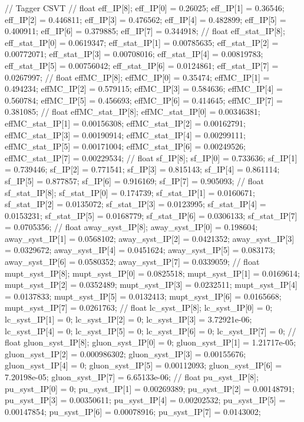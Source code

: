 // Tagger CSVT
// float eff_IP[8];
eff_IP[0] = 0.26025; eff_IP[1] = 0.36546; eff_IP[2] = 0.446811; 
eff_IP[3] = 0.476562; eff_IP[4] = 0.482899; eff_IP[5] = 0.400911; 
eff_IP[6] = 0.379885; eff_IP[7] = 0.344918; 
// float eff_stat_IP[8];
eff_stat_IP[0] = 0.0619347; eff_stat_IP[1] = 0.00785635; eff_stat_IP[2] = 0.00772071; 
eff_stat_IP[3] = 0.00708016; eff_stat_IP[4] = 0.00819783; eff_stat_IP[5] = 0.00756042; 
eff_stat_IP[6] = 0.0124861; eff_stat_IP[7] = 0.0267997; 
// float effMC_IP[8];
effMC_IP[0] = 0.35474; effMC_IP[1] = 0.494234; effMC_IP[2] = 0.579115; 
effMC_IP[3] = 0.584636; effMC_IP[4] = 0.560784; effMC_IP[5] = 0.456693; 
effMC_IP[6] = 0.414645; effMC_IP[7] = 0.381085; 
// float effMC_stat_IP[8];
effMC_stat_IP[0] = 0.00346381; effMC_stat_IP[1] = 0.00156308; effMC_stat_IP[2] = 0.00162791; 
effMC_stat_IP[3] = 0.00190914; effMC_stat_IP[4] = 0.00299111; effMC_stat_IP[5] = 0.00171004; 
effMC_stat_IP[6] = 0.00249526; effMC_stat_IP[7] = 0.00229534; 
// float sf_IP[8];
sf_IP[0] = 0.733636; sf_IP[1] = 0.739446; sf_IP[2] = 0.771541; 
sf_IP[3] = 0.815143; sf_IP[4] = 0.861114; sf_IP[5] = 0.877857; 
sf_IP[6] = 0.916169; sf_IP[7] = 0.905093; 
// float sf_stat_IP[8];
sf_stat_IP[0] = 0.174739; sf_stat_IP[1] = 0.0160671; sf_stat_IP[2] = 0.0135072; 
sf_stat_IP[3] = 0.0123995; sf_stat_IP[4] = 0.0153231; sf_stat_IP[5] = 0.0168779; 
sf_stat_IP[6] = 0.0306133; sf_stat_IP[7] = 0.0705356; 
// float away_syst_IP[8];
away_syst_IP[0] = 0.198604; away_syst_IP[1] = 0.0568102; away_syst_IP[2] = 0.0421352; 
away_syst_IP[3] = 0.0329672; away_syst_IP[4] = 0.0451624; away_syst_IP[5] = 0.083173; 
away_syst_IP[6] = 0.0580352; away_syst_IP[7] = 0.0339059; 
// float mupt_syst_IP[8];
mupt_syst_IP[0] = 0.0825518; mupt_syst_IP[1] = 0.0169614; mupt_syst_IP[2] = 0.0352489; 
mupt_syst_IP[3] = 0.0232511; mupt_syst_IP[4] = 0.0137833; mupt_syst_IP[5] = 0.0132413; 
mupt_syst_IP[6] = 0.0165668; mupt_syst_IP[7] = 0.0261763; 
// float lc_syst_IP[8];
lc_syst_IP[0] = 0; lc_syst_IP[1] = 0; lc_syst_IP[2] = 0; 
lc_syst_IP[3] = 3.72921e-06; lc_syst_IP[4] = 0; lc_syst_IP[5] = 0; 
lc_syst_IP[6] = 0; lc_syst_IP[7] = 0; 
// float gluon_syst_IP[8];
gluon_syst_IP[0] = 0; gluon_syst_IP[1] = 1.21717e-05; gluon_syst_IP[2] = 0.000986302; 
gluon_syst_IP[3] = 0.00155676; gluon_syst_IP[4] = 0; gluon_syst_IP[5] = 0.00112093; 
gluon_syst_IP[6] = 7.20198e-05; gluon_syst_IP[7] = 6.65133e-06; 
// float pu_syst_IP[8];
pu_syst_IP[0] = 0; pu_syst_IP[1] = 0.00269389; pu_syst_IP[2] = 0.00148791; 
pu_syst_IP[3] = 0.00350611; pu_syst_IP[4] = 0.00202532; pu_syst_IP[5] = 0.00147854; 
pu_syst_IP[6] = 0.00078916; pu_syst_IP[7] = 0.0143002; 

